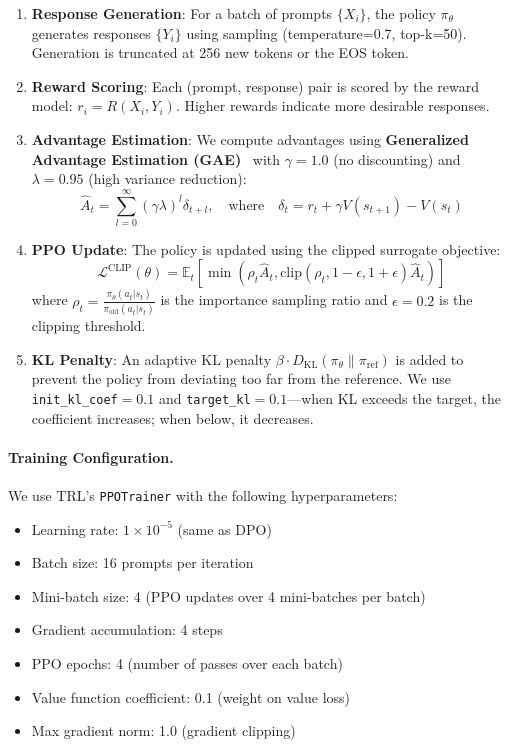 \begin{enumerate}[leftmargin=*]
    \item \textbf{Response Generation}: For a batch of prompts $\{X_i\}$, the policy $\pi_\theta$ generates responses $\{Y_i\}$ using sampling (temperature=0.7, top-k=50). Generation is truncated at 256 new tokens or the EOS token.

    \item \textbf{Reward Scoring}: Each (prompt, response) pair is scored by the reward model: $r_i = R(X_i, Y_i)$. Higher rewards indicate more desirable responses.

    \item \textbf{Advantage Estimation}: We compute advantages using \textbf{Generalized Advantage Estimation (GAE)}~\cite{schulman2015high} with $\gamma=1.0$ (no discounting) and $\lambda=0.95$ (high variance reduction):
    \begin{equation*}
        \hat{A}_t = \sum_{l=0}^{\infty} (\gamma \lambda)^l \delta_{t+l}, \quad \text{where} \quad \delta_t = r_t + \gamma V(s_{t+1}) - V(s_t)
    \end{equation*}

    \item \textbf{PPO Update}: The policy is updated using the clipped surrogate objective:
    \begin{equation*}
        \mathcal{L}^{\text{CLIP}}(\theta) = \mathbb{E}_t \left[ \min\left( \rho_t \hat{A}_t, \text{clip}(\rho_t, 1-\epsilon, 1+\epsilon) \hat{A}_t \right) \right]
    \end{equation*}
    where $\rho_t = \frac{\pi_\theta(a_t|s_t)}{\pi_{\text{old}}(a_t|s_t)}$ is the importance sampling ratio and $\epsilon=0.2$ is the clipping threshold.

    \item \textbf{KL Penalty}: An adaptive KL penalty $\beta \cdot D_{\text{KL}}(\pi_\theta \| \pi_{\text{ref}})$ is added to prevent the policy from deviating too far from the reference. We use \texttt{init\_kl\_coef}$=0.1$ and \texttt{target\_kl}$=0.1$---when KL exceeds the target, the coefficient increases; when below, it decreases.
\end{enumerate}

\paragraph{Training Configuration.} We use TRL's \texttt{PPOTrainer} with the following hyperparameters:
\begin{itemize}[leftmargin=*]
    \item Learning rate: $1 \times 10^{-5}$ (same as DPO)
    \item Batch size: 16 prompts per iteration
    \item Mini-batch size: 4 (PPO updates over 4 mini-batches per batch)
    \item Gradient accumulation: 4 steps
    \item PPO epochs: 4 (number of passes over each batch)
    \item Value function coefficient: 0.1 (weight on value loss)
    \item Max gradient norm: 1.0 (gradient clipping)
\end{itemize}

